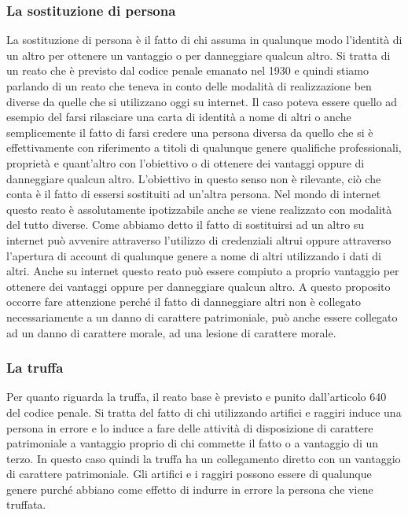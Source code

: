 \subsubsection*{La sostituzione di persona}
La sostituzione di persona è il fatto di chi assuma in qualunque modo l'identità di un altro per ottenere un vantaggio o per danneggiare qualcun altro. Si tratta di un reato che è previsto dal codice penale emanato nel 1930 e quindi stiamo parlando di un reato che teneva in conto delle modalità di realizzazione ben diverse da quelle che si utilizzano oggi su internet. Il caso poteva essere quello ad esempio del farsi rilasciare una carta di identità a nome di altri o anche semplicemente il fatto di farsi credere una persona diversa da quello che si è effettivamente con riferimento a titoli di qualunque genere qualifiche professionali, proprietà e quant'altro con l'obiettivo o di ottenere dei vantaggi oppure di danneggiare qualcun altro. L'obiettivo in questo senso non è rilevante, ciò che conta è il fatto di essersi sostituiti ad un'altra persona. Nel mondo di internet questo reato è assolutamente ipotizzabile anche se viene realizzato con modalità del tutto diverse. Come abbiamo detto il fatto di sostituirsi ad un altro su internet può avvenire attraverso l'utilizzo di credenziali altrui oppure attraverso l'apertura di account di qualunque genere a nome di altri utilizzando i dati di altri. Anche su internet questo reato può essere compiuto a proprio vantaggio per ottenere dei vantaggi oppure per danneggiare qualcun altro. A questo proposito occorre fare attenzione perché il fatto di danneggiare altri non è collegato necessariamente a un danno di carattere patrimoniale, può anche essere collegato ad un danno di carattere morale, ad una lesione di carattere morale.

\subsubsection{La truffa}
Per quanto riguarda la truffa, il reato base è previsto e punito dall'articolo 640 del codice penale. Si tratta del fatto di chi utilizzando artifici e raggiri induce una persona in errore e lo induce a fare delle attività di disposizione di carattere patrimoniale a vantaggio proprio di chi commette il fatto o a vantaggio di un terzo. In questo caso quindi la truffa ha un collegamento diretto con un vantaggio di carattere patrimoniale. Gli artifici e i raggiri possono essere di qualunque genere purché abbiano come effetto di indurre in errore la persona che viene truffata.

